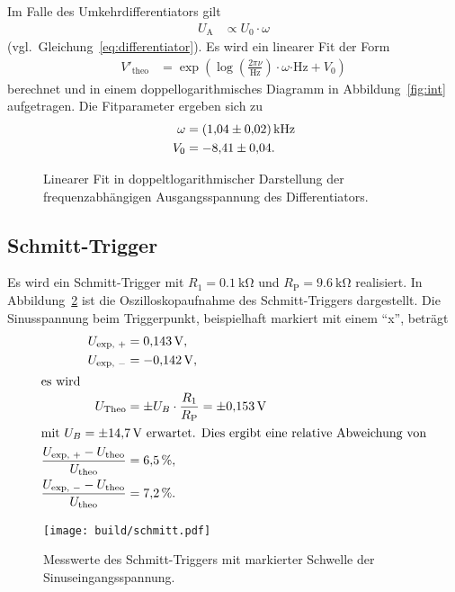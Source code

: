 Im Falle des Umkehrdifferentiators gilt
\begin{align*}
  U_\text{A} &\propto {U_0} \cdot {\omega}
\end{align*}
(vgl.\ Gleichung~\eqref{eq:differentiator}).
Es wird ein linearer Fit der Form
\begin{align*}
  V'_\text{theo} &= \exp{\left(\log{\left(\frac{2 \pi \nu}{\si{\hertz}}\right)} \cdot \omega\si{\cdot\hertz} + V_0 \right)}
\end{align*}
berechnet und in einem doppellogarithmisches Diagramm in Abbildung~\ref{fig:int} aufgetragen.
Die Fitparameter ergeben sich zu
\begin{align*}
  \omega &= \SI{1.04 \pm 0.02}{\kilo\hertz} \\
  V_0 &= \num{-8.41 \pm 0.04} .
\end{align*}
\begin{figure}[ht]
  \centering
  
  \caption{Linearer Fit in doppeltlogarithmischer Darstellung der frequenzabhängigen Ausgangsspannung des Differentiators.}
  \label{fig:dif}
\end{figure}

\subsection{Schmitt-Trigger}
Es wird ein Schmitt-Trigger mit $R_1 = \SI{0.1}{\kilo\ohm}$ und $R_\text{P} = \SI{9.6}{\kilo\ohm}$ realisiert.
In Abbildung~\ref{fig:schmitt} ist die Oszilloskopaufnahme des Schmitt-Triggers dargestellt.
Die Sinusspannung beim Triggerpunkt, beispielhaft markiert mit einem \enquote{x}, beträgt
\begin{align*}
  U_\text{exp, $+$} &= \SI{0.143}{\volt}, \\
  U_\text{exp, $-$} &= \SI{-0.142}{\volt}, \\
  \intertext{es wird}
  U_\text{Theo} &= \pm U_B \cdot \frac{R_1}{R_\text{P}} = \pm \SI{0.153}{\volt} \\
  \intertext{mit $U_B = \SI{\pm 14.7}{\volt}$ erwartet. Dies ergibt eine relative Abweichung von}
  \frac{U_\text{exp, $+$} - U_\text{theo}}{U_\text{theo}} &= \SI{6.5}{\percent}, \\
  \frac{U_\text{exp, $-$} - U_\text{theo}}{U_\text{theo}} &= \SI{7.2}{\percent}.
\end{align*}

\begin{figure}[ht]
  \centering
    \centering
    \texttt{[image: build/schmitt.pdf]}
    \caption{Messwerte des Schmitt-Triggers mit markierter Schwelle der Sinuseingangsspannung.}
    \label{fig:schmitt_plot}
  \label{fig:schmitt}
\end{figure}

